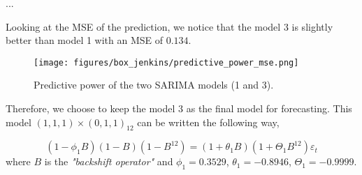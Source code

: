 ...

Looking at the MSE of the prediction, we notice that the model 3 is slightly better than model 1 with an MSE of $0.134$.
\begin{figure}[H]
	\centering
	\texttt{[image: figures/box\_jenkins/predictive\_power\_mse.png]}
	\caption{Predictive power of the two SARIMA models (1 and 3).}
	\label{fig:predictive-power-mse}
\end{figure}

Therefore, we choose to keep the model $3$ as the final model for forecasting. This model $(1, 1, 1) \times (0, 1, 1)_{12}$ can be written the following way,

\begin{equation} \label{eq:final-model}
	(1 - \phi_1 B)(1 - B)(1 - B^{12}) = (1 + \theta_1 B)(1 + \Theta_1 B^{12}) \varepsilon_t
\end{equation}
where $B$ is the \textit{"backshift operator"} and $\phi_1 = 0.3529$, $\theta_1 = -0.8946$, $\Theta_1 = -0.9999$.